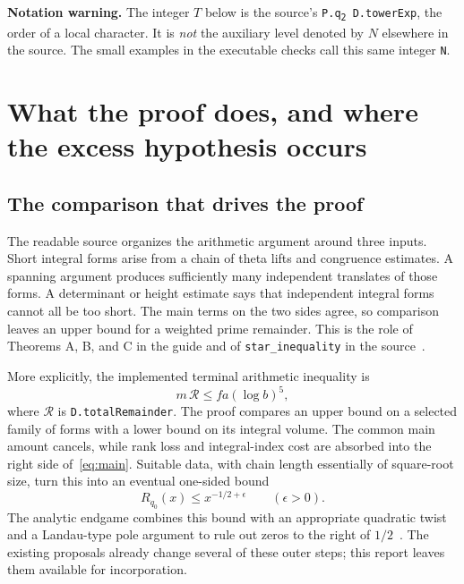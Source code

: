 \documentclass[11pt,a4paper]{article}
\newcommand{\src}[1]{\nolinkurl{#1}}
\theoremstyle{definition}
\theoremstyle{remark}
\begin{document}
\textbf{Notation warning.} The integer $T$ below is the source's
\texttt{P.q\textsubscript{2}\ D.towerExp}, the order of a local character. It is \emph{not}
the auxiliary level denoted by $N$ elsewhere in the source. The small examples
in the executable checks call this same integer \src{N}.

\newpage
\begingroup
\small
\setlength{\parskip}{0pt}
\tableofcontents
\endgroup
\newpage

\section{What the proof does, and where the excess hypothesis occurs}
\label{sec:context}

\subsection{The comparison that drives the proof}

The readable source organizes the arithmetic argument around three inputs.
Short integral forms arise from a chain of theta lifts and congruence
estimates. A spanning argument produces sufficiently many independent
translates of those forms. A determinant or height estimate says that
independent integral forms cannot all be too short. The main terms on the
two sides agree, so comparison leaves an upper bound for a weighted prime
remainder. This is the role of Theorems A, B, and C in the guide and of
\src{star_inequality} in the source~\cite{guide,mainineq}.

More explicitly, the implemented terminal arithmetic inequality is
\begin{equation}
 m\,\mathcal R\le f a (\log b)^5,
 \label{eq:main}
\end{equation}
where $\mathcal R$ is \src{D.totalRemainder}. The proof compares an upper
bound on a selected family of forms with a lower bound on its integral
volume. The common main amount cancels, while rank loss and integral-index
cost are absorbed into the right side of~\eqref{eq:main}. Suitable data,
with chain length essentially of square-root size, turn this into an
eventual one-sided bound
\[
 R_{q_0}(x)\le x^{-1/2+\epsilon}
 \qquad(\epsilon>0).
\]
The analytic endgame combines this bound with an appropriate quadratic
twist and a Landau-type pole argument to rule out zeros to the right of
$1/2$~\cite{onesided,guide}. The existing proposals already change several
of these outer steps; this report leaves them available for incorporation.
\end{document}
